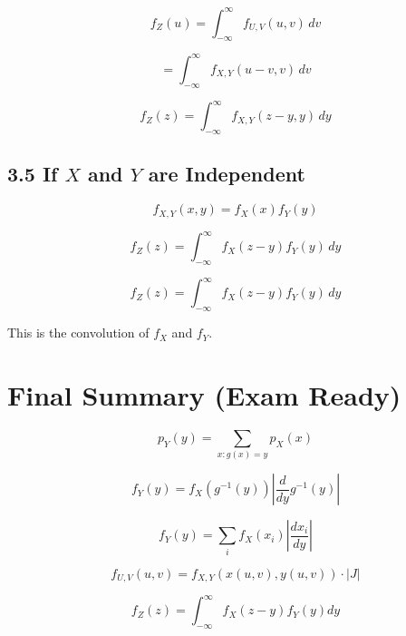 \documentclass[12pt]{article}
\begin{document}
\[
f_Z(u)
=
\int_{-\infty}^{\infty}
f_{U,V}(u,v) \, dv
\]

\[
=
\int_{-\infty}^{\infty}
f_{X,Y}(u-v, v) \, dv
\]

\[
\boxed{
f_Z(z)
=
\int_{-\infty}^{\infty}
f_{X,Y}(z-y, y) \, dy
}
\]

\subsection*{3.5 If $X$ and $Y$ are Independent}

\[
f_{X,Y}(x,y)
=
f_X(x) f_Y(y)
\]

\[
f_Z(z)
=
\int_{-\infty}^{\infty}
f_X(z-y) f_Y(y) \, dy
\]

\[
\boxed{
f_Z(z)
=
\int_{-\infty}^{\infty}
f_X(z-y) f_Y(y) \, dy
}
\]

This is the convolution of $f_X$ and $f_Y$.

\section*{Final Summary (Exam Ready)}

\[
p_Y(y)
=
\sum_{x: g(x)=y} p_X(x)
\]

\[
f_Y(y)
=
f_X(g^{-1}(y))
\left|
\frac{d}{dy} g^{-1}(y)
\right|
\]

\[
f_Y(y)
=
\sum_i
f_X(x_i)
\left|
\frac{dx_i}{dy}
\right|
\]

\[
f_{U,V}(u,v)
=
f_{X,Y}(x(u,v), y(u,v))
\cdot |J|
\]

\[
f_Z(z)
=
\int_{-\infty}^{\infty}
f_X(z-y) f_Y(y) dy
\]
\end{document}
